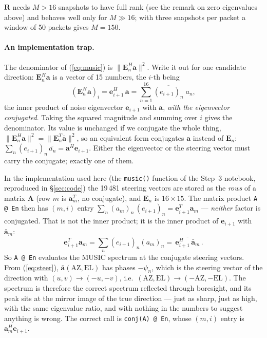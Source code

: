 \documentclass[11pt,a4paper]{article}
\newcommand{\vect}[1]{\mathbf{#1}}
\begin{document}
$\vect R$ needs $M > 16$ snapshots to have full rank (see the remark on zero eigenvalues above) and behaves well only for $M \gg 16$; with three snapshots per packet a window of 50 packets gives $M = 150$.

\paragraph{An implementation trap.}
The denominator of (\ref{eq:music}) is $\|\vect E_n^H\vect a\|^2$. Write it out for one candidate direction: $\vect E_n^H\vect a$ is a vector of 15 numbers, the $i$-th being
\[
  (\vect E_n^H\vect a)_i = \vect e_{i+1}^H\,\vect a = \sum_{n=1}^{16} \overline{(e_{i+1})_n}\; a_n ,
\]
the inner product of noise eigenvector $\vect e_{i+1}$ with $\vect a$, \emph{with the eigenvector conjugated}. Taking the squared magnitude and summing over $i$ gives the denominator. Its value is unchanged if we conjugate the whole thing, $\|\vect E_n^H\vect a\|^2 = \|\vect E_n^T\bar{\vect a}\|^2$, so an equivalent form conjugates $\vect a$ instead of $\vect E_n$: $\sum_n (e_{i+1})_n\,\overline{a_n} = \vect a^H\vect e_{i+1}$. Either the eigenvector or the steering vector must carry the conjugate; exactly one of them.

In the implementation used here (the \texttt{music()} function of the Step~3 notebook, reproduced in \S\ref{sec:code}) the 19\,481 steering vectors are stored as the \emph{rows} of a matrix $\vect A$ (row $m$ is $\vect a_m^T$, no conjugate), and $\vect E_n$ is $16\times15$. The matrix product \texttt{A @ En} then has $(m,i)$ entry $\sum_n (a_m)_n\,(e_{i+1})_n = \vect e_{i+1}^T\vect a_m$ --- \emph{neither} factor is conjugated. That is not the inner product; it is the inner product of $\vect e_{i+1}$ with $\bar{\vect a}_m$:
\[
  \vect e_{i+1}^T\vect a_m = \sum_n (e_{i+1})_n (a_m)_n = \overline{\,\vect e_{i+1}^H\,\bar{\vect a}_m\,}.
\]
So \texttt{A @ En} evaluates the MUSIC spectrum at the conjugate steering vectors. From (\ref{eq:steer}), $\bar{\vect a}(\mathrm{AZ}, \mathrm{EL})$ has phases $-\psi_n$, which is the steering vector of the direction with $(u, v) \to (-u, -v)$, i.e.\ $(\mathrm{AZ}, \mathrm{EL}) \to (-\mathrm{AZ}, -\mathrm{EL})$. The spectrum is therefore the correct spectrum reflected through boresight, and its peak sits at the mirror image of the true direction --- just as sharp, just as high, with the same eigenvalue ratio, and with nothing in the numbers to suggest anything is wrong. The correct call is \texttt{conj(A) @ En}, whose $(m,i)$ entry is $\vect a_m^H\vect e_{i+1}$.
\end{document}
